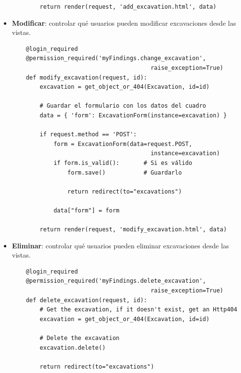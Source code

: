 \begin{itemize}
\begin{verbatim}
        return render(request, 'add_excavation.html', data)
    \end{verbatim}

        \item \textbf{Modificar}: controlar qué usuarios pueden modificar excavaciones
        desde las vistas.
    \begin{verbatim}
    @login_required
    @permission_required('myFindings.change_excavation', 
                                        raise_exception=True)
    def modify_excavation(request, id):
        excavation = get_object_or_404(Excavation, id=id)
        
        # Guardar el formulario con los datos del cuadro
        data = { 'form': ExcavationForm(instance=excavation) }
    
        if request.method == 'POST':
            form = ExcavationForm(data=request.POST,
                                        instance=excavation)
            if form.is_valid():       # Si es válido
                form.save()           # Guardarlo
    
                return redirect(to="excavations")
    
            data["form"] = form
    
        return render(request, 'modify_excavation.html', data)
    \end{verbatim}

        \item \textbf{Eliminar}: controlar qué usuarios pueden eliminar excavaciones
        desde las vistas.
    \begin{verbatim}
    @login_required
    @permission_required('myFindings.delete_excavation',
                                        raise_exception=True)
    def delete_excavation(request, id):
        # Get the excavation, if it doesn't exist, get an Http404
        excavation = get_object_or_404(Excavation, id=id)
    
        # Delete the excavation
        excavation.delete()    
    
        return redirect(to="excavations")
    \end{verbatim}
    \end{itemize}

